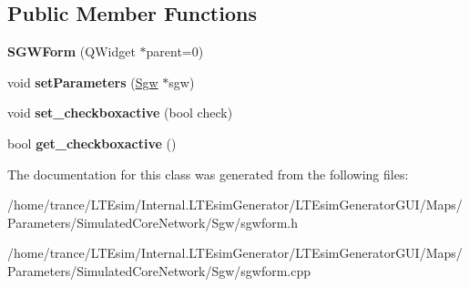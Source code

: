 \subsection*{Public Member Functions}
\begin{DoxyCompactItemize}
\item 
{\bfseries S\+G\+W\+Form} (Q\+Widget $\ast$parent=0)\hypertarget{class_s_g_w_form_a91aab835ae990d195da82a577e99f0ff}{}\label{class_s_g_w_form_a91aab835ae990d195da82a577e99f0ff}

\item 
void {\bfseries set\+Parameters} (\hyperlink{class_sgw}{Sgw} $\ast$sgw)\hypertarget{class_s_g_w_form_af73f86d871f33981ea423f0fdc67d0e7}{}\label{class_s_g_w_form_af73f86d871f33981ea423f0fdc67d0e7}

\item 
void {\bfseries set\+\_\+checkboxactive} (bool check)\hypertarget{class_s_g_w_form_a006cf052faf68b5b99446137f7daf40b}{}\label{class_s_g_w_form_a006cf052faf68b5b99446137f7daf40b}

\item 
bool {\bfseries get\+\_\+checkboxactive} ()\hypertarget{class_s_g_w_form_acd5bbdb5313f7215bab2bfa10ac494c7}{}\label{class_s_g_w_form_acd5bbdb5313f7215bab2bfa10ac494c7}

\end{DoxyCompactItemize}


The documentation for this class was generated from the following files\+:\begin{DoxyCompactItemize}
\item 
/home/trance/\+L\+T\+Esim/\+Internal.\+L\+T\+Esim\+Generator/\+L\+T\+Esim\+Generator\+G\+U\+I/\+Maps/\+Parameters/\+Simulated\+Core\+Network/\+Sgw/sgwform.\+h\item 
/home/trance/\+L\+T\+Esim/\+Internal.\+L\+T\+Esim\+Generator/\+L\+T\+Esim\+Generator\+G\+U\+I/\+Maps/\+Parameters/\+Simulated\+Core\+Network/\+Sgw/sgwform.\+cpp\end{DoxyCompactItemize}
